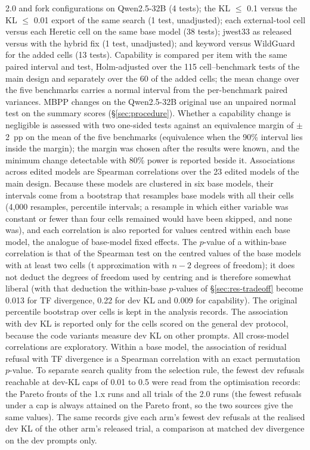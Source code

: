 2.0 and fork configurations on Qwen2.5-32B (4 tests); the KL $\le$ 0.1 versus the KL $\le$ 0.01 export of the same
search (1 test, unadjusted); each external-tool cell versus each Heretic cell on the same base model (38 tests);
jwest33 as released versus with the hybrid fix (1 test, unadjusted); and keyword versus WildGuard for the added
cells (13 tests). Capability is compared per item with the same paired interval and test, Holm-adjusted over the
115 cell--benchmark tests of the main design and separately over the 60 of the added cells; the mean change over
the five benchmarks carries a normal interval from the per-benchmark paired variances. MBPP changes on the
Qwen2.5-32B original use an unpaired normal test on the summary scores (\S\ref{sec:procedure}). Whether a
capability change is negligible is assessed with two one-sided tests against an equivalence margin of $\pm$2~pp on the
mean of the five benchmarks (equivalence when the 90\% interval lies inside the margin); the margin was chosen after
the results were known, and the minimum change detectable with 80\% power is reported beside it. Associations across
edited models are Spearman correlations over the 23 edited models of the main design. Because these models are
clustered in six base models, their intervals come from a bootstrap that resamples base models with all their cells
(4{,}000 resamples, percentile intervals; a resample in which either variable was constant or fewer than four cells
remained would have been skipped, and none was), and each correlation is also reported for values centred within each
base model, the analogue of base-model fixed effects. The $p$-value of a within-base correlation is that of the
Spearman test on the centred values of the base models with at least two cells (t approximation with $n-2$ degrees of
freedom); it does not deduct the degrees of freedom used by centring and is therefore somewhat liberal (with that
deduction the within-base $p$-values of \S\ref{sec:res-tradeoff} become 0.013 for TF divergence, 0.22 for dev KL and 0.009 for capability). The original
percentile bootstrap over cells is kept in the analysis records. The association
with dev KL is reported only for the cells scored on the general dev protocol, because the code variants measure dev
KL on other prompts. All cross-model correlations are exploratory. Within a base model, the association of residual refusal with TF
divergence is a Spearman correlation with an exact permutation $p$-value. To separate search quality from the
selection rule, the fewest dev refusals reachable at dev-KL caps of 0.01 to 0.5 were read from the optimisation
records: the Pareto fronts of the 1.x runs and all trials of the 2.0 runs (the fewest refusals under a cap is always
attained on the Pareto front, so the two sources give the same values). The same records give each arm's fewest dev
refusals at the realised dev KL of the other arm's released trial, a comparison at matched dev divergence on the dev
prompts only.

